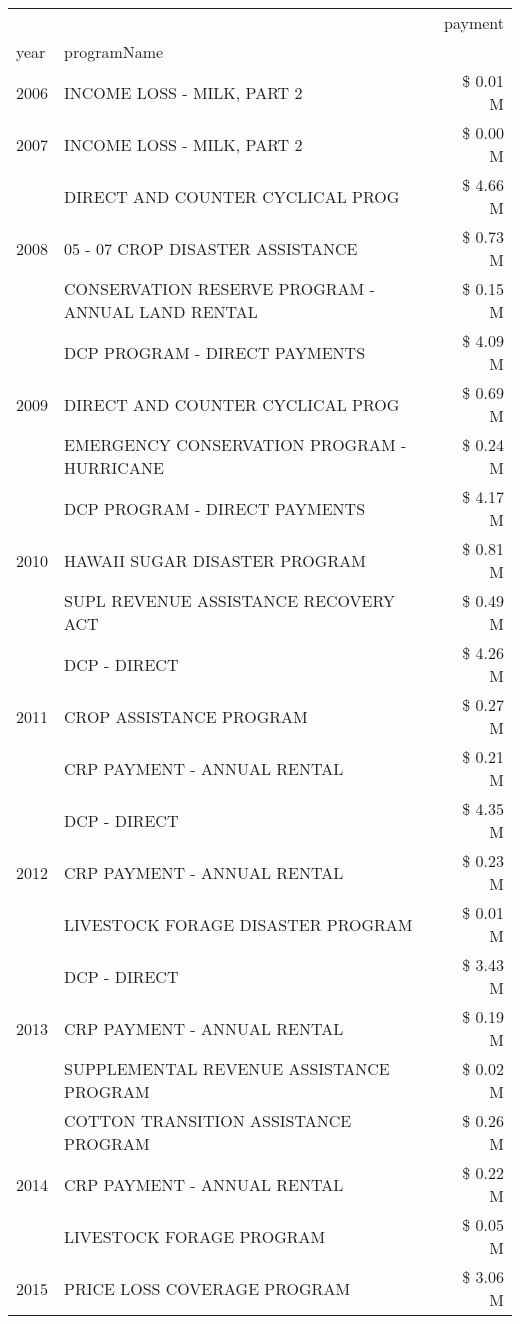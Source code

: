 \begin{tabular}{llr}
\toprule
 &  & payment \\
year & programName &  \\
\midrule
2006 & INCOME LOSS - MILK, PART 2 & \$ 0.01 M \\
\cline{1-3}
2007 & INCOME LOSS - MILK, PART 2 & \$ 0.00 M \\
\cline{1-3}
\multirow[t]{3}{*}{2008} & DIRECT AND COUNTER CYCLICAL PROG & \$ 4.66 M \\
 & 05 - 07 CROP DISASTER ASSISTANCE & \$ 0.73 M \\
 & CONSERVATION RESERVE PROGRAM - ANNUAL LAND RENTAL & \$ 0.15 M \\
\cline{1-3}
\multirow[t]{3}{*}{2009} & DCP PROGRAM - DIRECT PAYMENTS & \$ 4.09 M \\
 & DIRECT AND COUNTER CYCLICAL PROG & \$ 0.69 M \\
 & EMERGENCY CONSERVATION PROGRAM - HURRICANE & \$ 0.24 M \\
\cline{1-3}
\multirow[t]{3}{*}{2010} & DCP PROGRAM - DIRECT PAYMENTS & \$ 4.17 M \\
 & HAWAII SUGAR DISASTER PROGRAM & \$ 0.81 M \\
 & SUPL REVENUE ASSISTANCE RECOVERY ACT & \$ 0.49 M \\
\cline{1-3}
\multirow[t]{3}{*}{2011} & DCP - DIRECT & \$ 4.26 M \\
 & CROP ASSISTANCE PROGRAM & \$ 0.27 M \\
 & CRP PAYMENT - ANNUAL RENTAL & \$ 0.21 M \\
\cline{1-3}
\multirow[t]{3}{*}{2012} & DCP - DIRECT & \$ 4.35 M \\
 & CRP PAYMENT - ANNUAL RENTAL & \$ 0.23 M \\
 & LIVESTOCK FORAGE DISASTER PROGRAM & \$ 0.01 M \\
\cline{1-3}
\multirow[t]{3}{*}{2013} & DCP - DIRECT & \$ 3.43 M \\
 & CRP PAYMENT - ANNUAL RENTAL & \$ 0.19 M \\
 & SUPPLEMENTAL REVENUE ASSISTANCE PROGRAM & \$ 0.02 M \\
\cline{1-3}
\multirow[t]{3}{*}{2014} & COTTON TRANSITION ASSISTANCE PROGRAM & \$ 0.26 M \\
 & CRP PAYMENT - ANNUAL RENTAL & \$ 0.22 M \\
 & LIVESTOCK FORAGE PROGRAM & \$ 0.05 M \\
\cline{1-3}
\multirow[t]{3}{*}{2015} & PRICE LOSS COVERAGE PROGRAM & \$ 3.06 M \\

\end{tabular}
